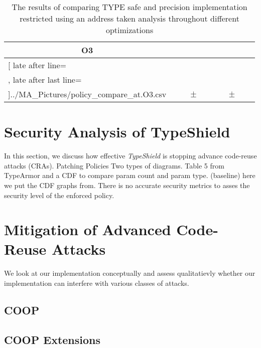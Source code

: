 \begin{table}[!htbp]
{\begin{tabular}{l|c|rcl|c|rcl|c}
\multicolumn{1}{c}{\bfseries O3}
	\\\midrule
	\csvreader[ late after line=\\, late after last line=\\\bottomrule]{../MA_Pictures/policy_compare_at.O3.csv}{
}
	{\csvcolii  &  \csvcoliii & \csvcolxiii & $\pm$ & \csvcolxiv & \csvcolxv & \csvcolxvi & $\pm$ & \csvcolxvii& \csvcolxviii}%

    	\end{tabular}
}
		\caption {The results of comparing TYPE safe and precision implementation restricted using an address taken analysis throughout different optimizations}
		\label{tbl:policycompat}
\end{table}

\section{Security Analysis of TypeShield}
\label{section:typeshieldsecurityanalysis}

In this section, we discuss how effective \textit{TypeShield} is 
stopping advance code-reuse attacks (CRAs).
Patching Policies
Two types of diagrams. Table 5 from TypeArmor and a CDF to compare param count and param type. (baseline)
here we put the CDF graphs from. There is no accurate security metrics to asses the security level of the enforced policy.




\section{Mitigation of Advanced Code-Reuse Attacks}
\label{section:mitiagtion}
We look at our implementation conceptually and assess qualitatievly whether our implementation can interfere with various classes of attacks. 

\subsection{COOP}
\label{Effectiveness against COOP}

\subsection{COOP Extensions}
\label{COOP Extensions}

